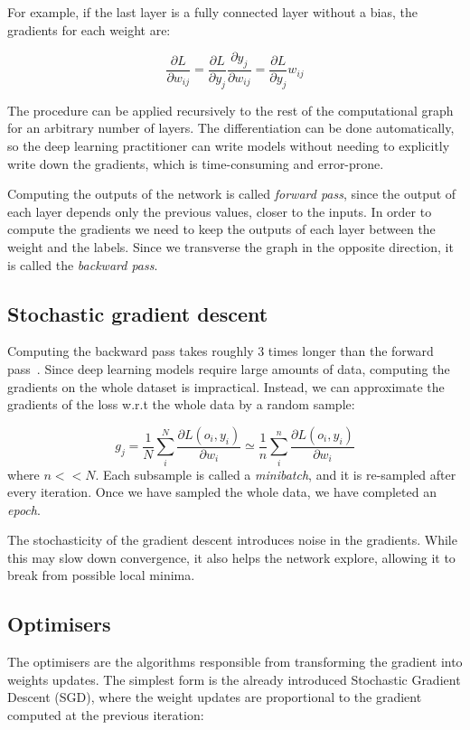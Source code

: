 For example, if the last layer is a fully connected layer without a bias, the gradients for each weight are:

\begin{equation*}
\frac{\partial L}{\partial w_{ij}} = \frac{\partial L}{\partial y_j} \frac{\partial y_j}{\partial w_{ij}} =  \frac{\partial L}{\partial y_j}  w_{ij}
\end{equation*}

The procedure can be applied recursively to the rest of the computational graph for an arbitrary number of layers.
The differentiation can be done automatically, so the deep learning practitioner can write models without needing to explicitly write down the gradients, which is time-consuming and error-prone.

Computing the outputs 
of the network is called \emph{forward pass}, since the output of each layer depends only the previous values, closer to the inputs.
In order to compute the gradients we need to keep the outputs of each layer between the weight and the labels.
Since we transverse the graph in the opposite direction, it is called the \emph{backward pass}.

\subsection{Stochastic gradient descent}
Computing the backward pass takes roughly 3 times longer than the forward pass~\citep{dl_course}.
Since deep learning models require large amounts of data, computing the gradients on the whole dataset is impractical.
Instead, we can approximate the gradients of the loss w.r.t the whole data by a random sample:

\begin{equation*}
g_j = \frac{1}{N} \sum_i^N \frac{\partial L\left(o_i, y_i\right)}{\partial w_i} \simeq \frac{1}{n} \sum_i^n \frac{\partial L\left(o_i, y_i\right)}{\partial w_i}
\end{equation*}
where $n << N$.
Each subsample is called a \emph{minibatch}, 
and it is re-sampled after every iteration.
Once we have sampled the whole data, we have completed an \emph{epoch}.

The stochasticity of the gradient descent introduces noise in the gradients.
While this may slow down convergence, it also helps the network explore, allowing it to break from possible local minima.

\subsection{Optimisers}
The optimisers are the algorithms responsible from transforming the gradient into weights updates.
The simplest form is the already introduced Stochastic Gradient Descent (SGD), 
where the weight updates are proportional to the gradient computed at the previous iteration:

